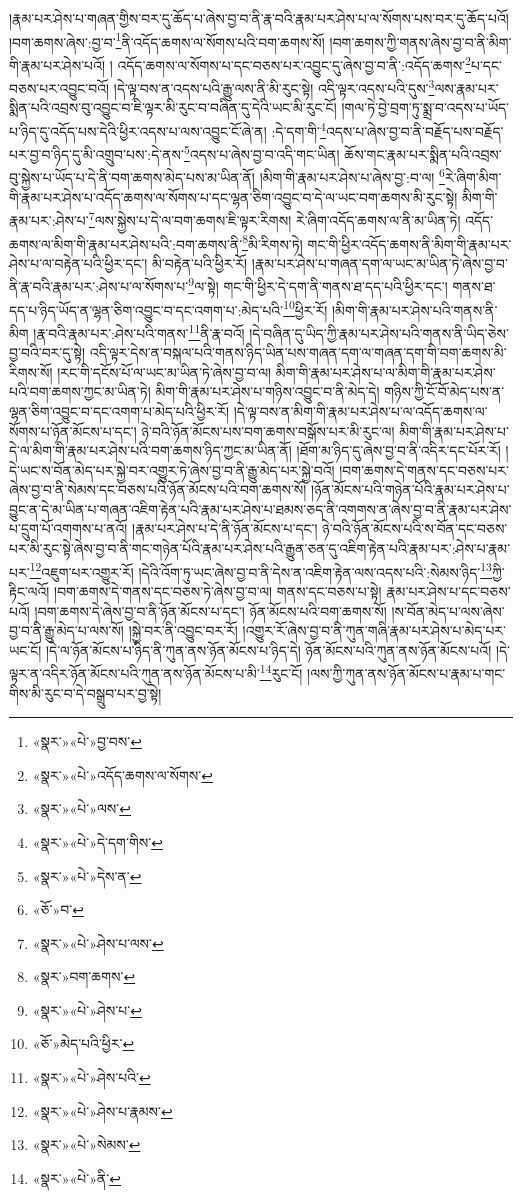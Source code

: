 །རྣམ་པར་ཤེས་པ་གཞན་གྱིས་བར་དུ་ཆོད་པ་ཞེས་བྱ་བ་ནི་རྣ་བའི་རྣམ་པར་ཤེས་པ་ལ་སོགས་པས་བར་དུ་ཆོད་པའོ། །བག་ཆགས་ཞེས་:བྱ་བ་\footnote{«སྣར་»«པེ་»བྱ་བས་}ནི་འདོད་ཆགས་ལ་སོགས་པའི་བག་ཆགས་སོ། །བག་ཆགས་ཀྱི་གནས་ཞེས་བྱ་བ་ནི་མིག་གི་རྣམ་པར་ཤེས་པའོ། །
འདོད་ཆགས་ལ་སོགས་པ་དང་བཅས་པར་འབྱུང་དུ་ཞེས་བྱ་བ་ནི་:འདོད་ཆགས་\footnote{«སྣར་»«པེ་»འདོད་ཆགས་ལ་སོགས་}པ་དང་བཅས་པར་འབྱུང་བའོ། །དེ་ལྟ་བས་ན་འདས་པའི་རྒྱུ་ལས་ནི་མི་རུང་སྟེ། འདི་ལྟར་འདས་པའི་དུས་\footnote{«སྣར་»«པེ་»ལས་}ལས་རྣམ་པར་སྨིན་པའི་འབྲས་བུ་འབྱུང་བ་ཇི་ལྟར་མི་རུང་བ་བཞིན་དུ་དེའི་ཡང་མི་རུང་ངོ། །གལ་ཏེ་བྱེ་བྲག་ཏུ་སྨྲ་བ་འདས་པ་ཡོད་པ་ཉིད་དུ་འདོད་པས་དེའི་ཕྱིར་འདས་པ་ལས་འབྱུང་ངོ་ཞེ་ན། :དེ་དག་གི་\footnote{«སྣར་»«པེ་»དེ་དག་གིས་}འདས་པ་ཞེས་བྱ་བ་ནི་བརྗོད་པས་བརྗོད་པར་བྱ་བ་ཉིད་དུ་མི་འགྲུབ་པས་:དེ་ནས་\footnote{«སྣར་»«པེ་»དེས་ན་}འདས་པ་ཞེས་བྱ་བ་འདི་གང་ཡིན། ཆོས་གང་རྣམ་པར་སྨིན་པའི་འབྲས་བུ་སྐྱེས་པ་ཡོད་པ་དེ་ནི་བག་ཆགས་མེད་པས་མ་ཡིན་ནོ། །མིག་གི་རྣམ་པར་ཤེས་པ་ཞེས་བྱ་:བ་ལ། \footnote{«ཅོ་»བ་}རེ་ཞིག་མིག་གི་རྣམ་པར་ཤེས་པ་འདོད་ཆགས་ལ་སོགས་པ་དང་ལྷན་ཅིག་འབྱུང་བ་དེ་ལ་ཡང་བག་ཆགས་མི་རུང་སྟེ། མིག་གི་རྣམ་པར་:ཤེས་པ་\footnote{«སྣར་»«པེ་»ཤེས་པ་ལས་}ལས་སྐྱེས་པ་དེ་ལ་བག་ཆགས་ཇི་ལྟར་རིགས། རེ་ཞིག་འདོད་ཆགས་ལ་ནི་མ་ཡིན་ཏེ། འདོད་ཆགས་ལ་མིག་གི་རྣམ་པར་ཤེས་པའི་:བག་ཆགས་ནི་\footnote{«སྣར་»བག་ཆགས་}མི་རིགས་ཏེ། གང་གི་ཕྱིར་འདོད་ཆགས་ནི་མིག་གི་རྣམ་པར་ཤེས་པ་ལ་བརྟེན་པའི་ཕྱིར་དང་། མི་བརྟེན་པའི་ཕྱིར་རོ། །རྣམ་པར་ཤེས་པ་གཞན་དག་ལ་ཡང་མ་ཡིན་ཏེ་ཞེས་བྱ་བ་ནི་རྣ་བའི་རྣམ་པར་:ཤེས་པ་ལ་སོགས་པ་\footnote{«སྣར་»«པེ་»ཤེས་པ་}ལ་སྟེ། གང་གི་ཕྱིར་དེ་དག་ནི་གནས་ཐ་དད་པའི་ཕྱིར་དང་། གནས་ཐ་དད་པ་ཉིད་ཡོད་ན་ལྷན་ཅིག་འབྱུང་བ་དང་འགག་པ་:མེད་པའི་\footnote{«ཅོ་»མེད་པའི་ཕྱིར་}ཕྱིར་རོ། །མིག་གི་རྣམ་པར་ཤེས་པའི་གནས་ནི་མིག །རྣ་བའི་རྣམ་པར་:ཤེས་པའི་གནས་\footnote{«སྣར་»«པེ་»ཤེས་པའི་}ནི་རྣ་བའོ། །དེ་བཞིན་དུ་ཡིད་ཀྱི་རྣམ་པར་ཤེས་པའི་གནས་ནི་ཡིད་ཅེས་བྱ་བའི་བར་དུ་སྟེ། འདི་ལྟར་དེས་ན་བསྐལ་པའི་གནས་ཉིད་ཡིན་པས་གཞན་དག་ལ་གཞན་དག་གི་བག་ཆགས་མི་རིགས་སོ། །རང་གི་དངོས་པོ་ལ་ཡང་མ་ཡིན་ཏེ་ཞེས་བྱ་བ་ལ། མིག་གི་རྣམ་པར་ཤེས་པ་ལ་མིག་གི་རྣམ་པར་ཤེས་པའི་བག་ཆགས་ཀྱང་མ་ཡིན་ཏེ། མིག་གི་རྣམ་པར་ཤེས་པ་གཉིས་འབྱུང་བ་ནི་མེད་དེ། གཉིས་ཀྱི་ངོ་བོ་མེད་པས་ན་ལྷན་ཅིག་འབྱུང་བ་དང་འགག་པ་མེད་པའི་ཕྱིར་རོ། །དེ་ལྟ་བས་ན་མིག་གི་རྣམ་པར་ཤེས་པ་ལ་འདོད་ཆགས་ལ་སོགས་པ་ཉོན་མོངས་པ་དང་། ཉེ་བའི་ཉོན་མོངས་པས་བག་ཆགས་བསྒོས་པར་མི་རུང་ལ། མིག་གི་རྣམ་པར་ཤེས་པ་དེ་ལ་མིག་གི་རྣམ་པར་ཤེས་པའི་བག་ཆགས་ཉིད་ཀྱང་མ་ཡིན་ནོ། །ཐོག་མ་ཉིད་དུ་ཞེས་བྱ་བ་ནི་འདིར་དང་པོར་རོ། །དེ་ཡང་ས་བོན་མེད་པར་སྐྱེ་བར་འགྱུར་ཏེ་ཞེས་བྱ་བ་ནི་རྒྱུ་མེད་པར་སྐྱེ་བའོ། །བག་ཆགས་དེ་གནས་དང་བཅས་པར་ཞེས་བྱ་བ་ནི་སེམས་དང་བཅས་པའི་ཉོན་མོངས་པའི་བག་ཆགས་སོ། །ཉོན་མོངས་པའི་གཉེན་པོའི་རྣམ་པར་ཤེས་པ་བྱུང་ན་དེ་མ་ཡིན་པ་གཞན་འཇིག་རྟེན་པའི་རྣམ་པར་ཤེས་པ་ཐམས་ཅད་ནི་འགགས་ན་ཞེས་བྱ་བ་ནི་རྣམ་པར་ཤེས་པ་དྲུག་པོ་འགགས་པ་ནའོ། །རྣམ་པར་ཤེས་པ་དེ་ནི་ཉོན་མོངས་པ་དང་། ཉེ་བའི་ཉོན་མོངས་པའི་ས་བོན་དང་བཅས་པར་མི་རུང་སྟེ་ཞེས་བྱ་བ་ནི་གང་གཉེན་པོའི་རྣམ་པར་ཤེས་པའི་རྒྱུན་ཅན་དུ་འཇིག་རྟེན་པའི་རྣམ་པར་:ཤེས་པ་རྣམ་པར་\footnote{«སྣར་»«པེ་»ཤེས་པ་རྣམས་}འཇུག་པར་འགྱུར་རོ། །དེའི་འོག་ཏུ་ཡང་ཞེས་བྱ་བ་ནི་དེས་ན་འཇིག་རྟེན་ལས་འདས་པའི་:སེམས་ཉིད་\footnote{«སྣར་»«པེ་»སེམས་}ཀྱི་རྟིང་ལའོ། །བག་ཆགས་དེ་གནས་དང་བཅས་ཏེ་ཞེས་བྱ་བ་ལ། གནས་དང་བཅས་པ་སྟེ། རྣམ་པར་ཤེས་པ་དང་བཅས་པའོ། །བག་ཆགས་དེ་ཞེས་བྱ་བ་ནི་ཉོན་མོངས་པ་དང་། ཉོན་མོངས་པའི་བག་ཆགས་སོ། །ས་བོན་མེད་པ་ལས་ཞེས་བྱ་བ་ནི་རྒྱུ་མེད་པ་ལས་སོ། །སྐྱེ་བར་ནི་འབྱུང་བར་རོ། །འགྱུར་རོ་ཞེས་བྱ་བ་ནི་ཀུན་གཞི་རྣམ་པར་ཤེས་པ་མེད་པར་ཡང་ངོ། །དེ་ལ་ཉོན་མོངས་པ་ཉིད་ནི་ཀུན་ནས་ཉོན་མོངས་པ་ཉིད་དེ། ཉོན་མོངས་པའི་ཀུན་ནས་ཉོན་མོངས་པའོ། །དེ་ལྟར་ན་འདིར་ཉོན་མོངས་པའི་ཀུན་ནས་ཉོན་མོངས་པ་མི་\footnote{«སྣར་»«པེ་»ནི་}རུང་ངོ། །ལས་ཀྱི་ཀུན་ནས་ཉོན་མོངས་པ་རྣམ་པ་གང་གིས་མི་རུང་བ་དེ་བསྒྲུབ་པར་བྱ་སྟེ། 